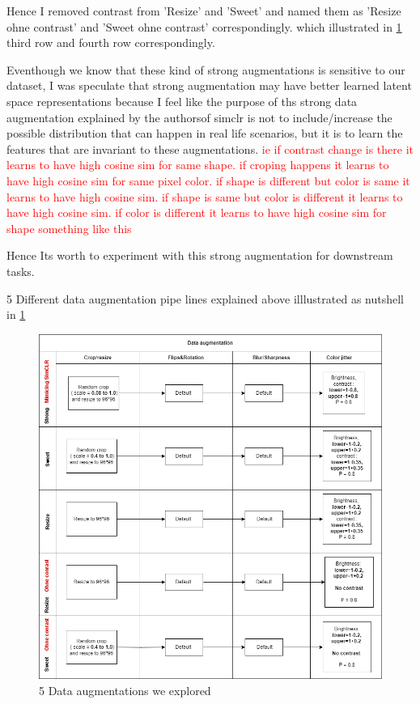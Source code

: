  
Hence I removed contrast from 'Resize' and 'Sweet' and named them as 'Resize ohne contrast' and 'Sweet ohne contrast' correspondingly. 
which illustrated in \ref{fig:strong_aug} third row and fourth row correspondingly. 

Eventhough we know that these kind of strong augmentations is sensitive to our dataset, I was speculate that strong augmentation may
 have better learned latent space representations because I feel like the purpose of ths strong data augmentation explained by the authorsof simclr is not to
 include/increase the possible distribution that can happen in real life scenarios, but it is to learn the features that are invariant to these augmentations.
 \textcolor{red}{ie if contrast change is there it learns to have high cosine sim for same shape. if croping happens it learns to have high cosine sim for same pixel 
 color. if shape is different but color is same it learns to have high cosine sim. if shape is same but color is different it learns to have high cosine sim. if  color
  is different it learns to have high cosine sim for shape something like this}

Hence Its worth to experiment with this strong augmentation for downstream tasks.


5 Different data augmentation pipe lines explained above illlustrated as nutshell in \ref{fig:strong_aug}
\begin{figure}[H]
  \centering
  \includegraphics[scale=0.6]{figures/strong_aug.png} 
  \caption{5 Data augmentations we explored}
  \label{fig:strong_aug}
\end{figure}



